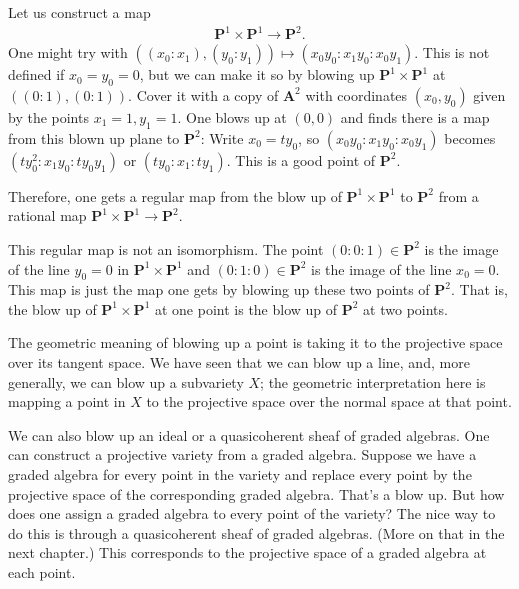 \documentclass [11 pt, oneside, margin = 1 in] {article}
\begin{document}
\begin{example}[ ]\label{}\text{}
Let us construct a map 
\begin{align*}
	\mathbf{P}^1\times \mathbf{P}^1\longrightarrow \mathbf{P}^2.
\end{align*}
One might try with $((x_0:x_1),(y_0:y_1)) \longmapsto (x_0y_0:x_1y_0:x_0y_1)$. This is not defined if $x_0=y_0=0$, but we can make it so by blowing up $\mathbf{P}^1\times \mathbf{P}^1$ at $((0:1), (0:1) )$. Cover it with a copy of $\mathbf{A}^2$ with coordinates $(x_0,y_0)$ given by the points $x_1=1,y_1=1$. One blows up at $(0,0)$ and finds there is a map from this blown up plane to $\mathbf{P}^2$: Write $x_0=ty_0$, so $(x_0y_0:x_1y_0:x_0y_1)$ becomes $(ty_0^2:x_1y_0:ty_0y_1)$ or $(ty_0:x_1:ty_1)$. This is a good point of $\mathbf{P}^2$.

Therefore, one gets a regular map from the blow up of $\mathbf{P}^1\times \mathbf{P}^1$ to $\mathbf{P}^2$ from a rational map $\mathbf{P}^1\times \mathbf{P}^1\longrightarrow \mathbf{P}^2$.

\begin{remark}
	This regular map is not an isomorphism. The point $(0:0:1)\in  \mathbf{P}^2$ is the image of the line $y_0=0$ in $\mathbf{P}^1\times \mathbf{P}^1$ and $(0:1:0)\in \mathbf{P}^2$ is the image of the line $x_0=0$. This map is just the map one gets by blowing up these two points of $\mathbf{P}^2$. That is, the blow up of $\mathbf{P}^1\times \mathbf{P}^1$ at one point is the blow up of $\mathbf{P}^2$ at two points.
\end{remark}
\end{example}

The geometric meaning of blowing up a point is taking it to the projective space over its tangent space. We have seen that we can blow up a line, and, more generally, we can blow up a subvariety $X$; the geometric interpretation here is mapping a point in $X$ to the projective space over the normal space at that point. 

We can also blow up an ideal or a quasicoherent sheaf of graded algebras. One can construct a projective variety from a graded algebra. Suppose we have a graded algebra for every point in the variety and replace every point by the projective space of the corresponding graded algebra. That's a blow up. But how does one assign a graded algebra to every point of the variety? The nice way to do this is through a quasicoherent sheaf of graded algebras. (More on that in the next chapter.) This corresponds to the projective space of a graded algebra at each point.
\end{document}
